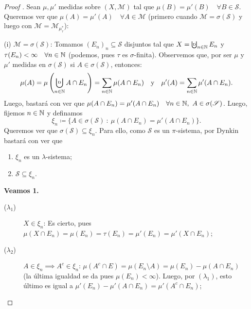 \begin{proof}[Proof ]
	Sean $\mu,\mu'$ medidas sobre $(X, \mathscr{M})$ tal que $\mu(B) = \mu'(B) \quad \forall B \in \mathscr{S}$. Queremos ver que $\mu(A) = \mu'(A) \quad \forall A \in \mathscr{M}$ (primero cuando $\mathscr{M} = \sigma(\mathscr{S})$ y luego con $\mathscr{M} = \mathscr{M}_{\mu^{*}_{\tau}}$): \par
	\smallskip
	(i) $\mathscr{M} = \sigma(\mathscr{S})$: Tomamos $(E_n)_n \subseteq \mathscr{S}$ disjuntos tal que $X = \textbigcupd_{n\in\N} E_n$ y $\tau(E_n) < \infty \quad \forall n\in\mathbb{N}$ (podemos, pues $\tau$ es $\sigma$-finita). Observemos que, por ser $\mu$ y $\mu'$ medidas en $\sigma(\mathscr{S})$ si $A \in \sigma(\mathscr{S})$, entonces:
	\[ \mu(A) = \mu \left( \bigcupd_{n\in\N} A \cap E_n \right) = \sum_{n\in\N} \mu(A \cap E_n) \quad \text{y} \quad \mu'(A) = \sum_{n\in\N} \mu'(A \cap E_n). \]
	Luego, bastará con ver que $\mu(A \cap E_n) = \mu'(A \cap E_n) \quad \forall n \in \mathbb{N},\ A \in \sigma(\mathscr{S})$. Luego, fijemos $n\in\mathbb{N}$ y definamos
	\[ \xi_n \coloneq \{A \in \sigma(\mathscr{S}) \ : \ \mu(A \cap E_n) = \mu'(A \cap E_n)\}. \]
	Queremos ver que $\sigma(\mathscr{S}) \subseteq \xi_n$. Para ello, como $\mathscr{S}$ es un $\pi$-sistema, por Dynkin bastará con ver que
	\begin{enumerate}
		\item $\xi_n$ es un $\lambda$-sistema;

		\item $\mathscr{S} \subseteq \xi_n$.
	\end{enumerate}
	\textbf{Veamos 1.}
	\begin{description}
		\item[($\lambda_{1}$)] $X \in \xi_n$: Es cierto, pues $\mu(X \cap E_n) = \mu(E_n) = \tau(E_n) = \mu'(E_n) = \mu'(X \cap E_n)$;

		\item[($\lambda_{2}$)] $A \in \xi_n \implies A^c \in \xi_n$: $\mu(A^c \cap E) = \mu(E_n \setminus A) = \mu(E_n) - \mu(A \cap E_n)$ (la última igualdad se da pues $\mu(E_n) < \infty$). Luego, por $(\lambda_{1})$, esto último es igual a $\mu'(E_n) - \mu'(A \cap E_n) = \mu'(A^c \cap E_n)$;


\end{description}
\end{proof}
